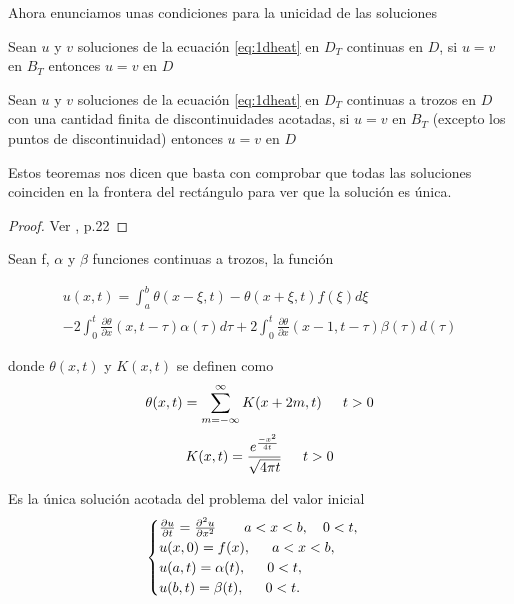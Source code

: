 Ahora enunciamos unas condiciones para la unicidad de las soluciones

\begin{teorema}[Unicidad]
	Sean $u$ y $v$ soluciones de la ecuación \ref{eq:1dheat} en $D_T$ continuas en $D$, si $u=v$ en $B_T$ entonces $u=v$ en $D$
\end{teorema}

\begin{teorema}
	Sean $u$ y $v$ soluciones de la ecuación \ref{eq:1dheat} en $D_T$ continuas a trozos en $D$ con una cantidad finita de discontinuidades acotadas, si $u=v$ en $B_T$ (excepto los puntos de discontinuidad) entonces $u=v$ en $D$
\end{teorema}

Estos teoremas nos dicen que basta con comprobar que todas las soluciones coinciden en la frontera del rectángulo para ver que la solución es única.

\begin{proof}
	Ver \cite{1dheat}, p.22
\end{proof}



\begin{teorema}\label{teo:exis_uni_1dheat}
	Sean f, $\alpha$ y $\beta$ funciones continuas a trozos, la función
	
	\begin{multline}\label{eq:sol1dheat}
		u(x,t) = \int_{a}^{b}\theta(x-\xi,t)-\theta(x+\xi,t)f(\xi)d\xi \\
		- 2\int_{0}^{t}\frac{\partial \theta}{\partial x}(x, t-\tau)\alpha(\tau)d\tau+2\int_{0}^{t}\frac{\partial\theta}{\partial x}(x-1,t-\tau)\beta(\tau)d(\tau)
	\end{multline}
	
	donde $\theta(x,t)$ y $K(x,t)$ se definen como
	\[
		\theta(x,t)=\sum_{m=-\infty}^{\infty}K(x+2m,t) \hspace{15px} t>0
	\]\[
		K(x,t)=\frac{e^{\frac{-x^2}{4t}}}{\sqrt{4\pi t}}\hspace{15px} t>0
	\]
	
	Es la única solución acotada del problema del valor inicial
	\begin{equation}\label{eq:pvi1dheat}
		\begin{cases}
			\frac{\partial u}{\partial t} = \frac{\partial ^2u}{\partial x^2} \hspace{20px}a<x<b, \hspace{10px} 0<t, \\
			u(x,0)=f(x), \hspace{15px} a<x<b, \\
			u(a,t)=\alpha(t), \hspace{15px} 0<t, \\
			u(b,t)=\beta(t), \hspace{15px} 0<t.
		\end{cases}
	\end{equation}
	
\end{teorema}

